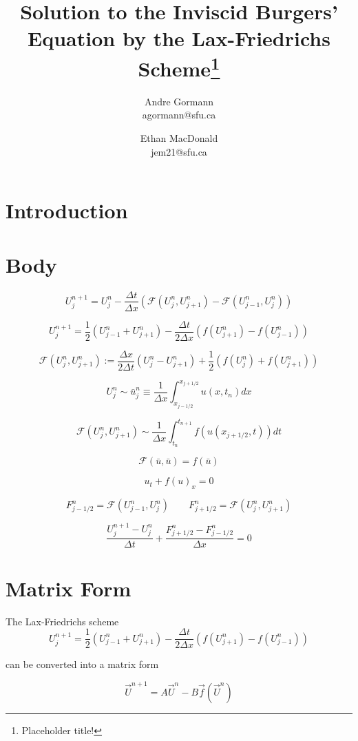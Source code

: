 \documentclass{myproject}
\title{\vspace*{-1cm}Solution to the Inviscid Burgers' Equation by the Lax-Friedrichs Scheme\footnote{Placeholder title!}}
\date{}
\author{
    Andre Gormann\\
    agormann@sfu.ca
    \and
    Ethan MacDonald\\
    jem21@sfu.ca
}
\begin{document}
\maketitle
\vspace*{-1cm}


\section{Introduction}

\section{Body}

\[
    U_j^{n+1} = U_j^n - \frac{\Delta t}{\Delta x} \left( \mathcal{F}(U_{j}^{n}, U_{j+1}^{n}) - \mathcal{F}(U_{j-1}^{n}, U_{j}^{n}) \right)
\]

\[
    U_j^{n+1} = \frac{1}{2}\left( U_{j-1}^{n} + U_{j+1}^{n} \right) - \frac{\Delta t}{2\Delta x}\left( f(U_{j+1}^{n}) - f(U_{j-1}^{n}) \right)
\]

\[
    \mathcal{F}(U_j^n, U_{j+1}^n) := \frac{\Delta x}{2 \Delta t}(U_j^n - U_{j+1}^n) + \frac{1}{2}\left( f(U_j^n) + f(U_{j+1}^n) \right)
\]

\[
    U_j^n \sim \bar{u}_j^n \equiv \frac{1}{\Delta x} \int_{x_{j-1/2}}^{x_{j+1/2}} u(x,t_n) dx
\]

\[
    \mathcal{F}(U_j^n, U_{j+1}^n) \sim \frac{1}{\Delta x} \int_{t_n}^{t_{n+1}} f(u(x_{j+1/2}, t)) dt
\]

\[
    \mathcal{F}(\bar{u}, \bar{u}) = f(\bar{u})
\]

\[
    u_t + f(u)_x = 0
\]

\[
    F_{j-1/2}^n = \mathcal{F}(U_{j-1}^n, U_j^n) \qquad F_{j+1/2}^n = \mathcal{F}(U_{j}^n, U_{j+1}^n)
\]

\[
    \frac{U_j^{n+1} - U_j^n}{\Delta t} + \frac{F_{j+1/2}^n - F_{j-1/2}^n}{\Delta x} = 0
\]

\section{Matrix Form}
The Lax-Friedrichs scheme
\[
    U_j^{n+1} = \frac{1}{2}\left( U_{j-1}^{n} + U_{j+1}^{n} \right) - \frac{\Delta t}{2\Delta x}\left( f(U_{j+1}^{n}) - f(U_{j-1}^{n}) \right)
\]

can be converted into a matrix form

\[
\vec{U}^{n+1} = A\vec{U}^{n} - B\vec{f}(\vec{U}^{n})
\]
\end{document}
